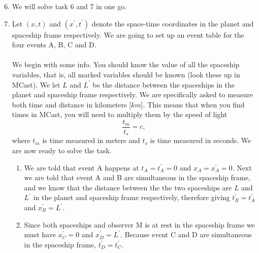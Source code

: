 \documentclass[a4paper,10pt,english]{article}
\begin{document}
\begin{enumerate}
\setcounter{enumi}{5}

\item We will solve task 6 and 7 in one go.
\item Let $(x,t)$ and $(x^{\prime},t^{\prime})$ denote the space-time coordinates in the planet and spaceship frame respectively. We are going to set up an event table for the four events A, B, C and D.
\\ \\
We begin with some info. You should know the value of all the spaceship variables, that is, all marked variables should be known (look these up in MCast). We let $L$ and $L^{\prime}$ be the distance between the spaceships in the planet and spaceship frame respectively. We are specifically asked to measure both time and distance in kilometers [$km$]. This means that when you find times in MCast, you will need to multiply them by the speed of light \[\frac{t_{m}}{t_{s}}=c,\] where $t_{m}$ is time measured in meters and $t_{s}$ is time measured in seconds. We are now ready to solve the task.
\\ 
\begin{enumerate} %
\item We are told that event A happens at $t_{A}=t_{A}^{\prime}=0$ and $x_{A}=x_{A}^{\prime}=0$. Next we are told that event A and B are simultaneous in the spaceship frame, and we know that the distance between the the two spaceships are $L$ and $L^{\prime}$ in the planet and spaceship frame respectively, therefore giving $t_{B}^{\prime}=t^{\prime}_{A}$ and $x_{B}^{\prime}=L^{\prime}$.

\item Since both spaceships and observer M is at rest in the spaceship frame we must have $x_{C}^{\prime}=0$ and $x^{\prime}_{D}=L^{\prime}$. Because event C and D are simultaneous in the spaceship frame, $t^{\prime}_{D}=t^{\prime}_{C}$.


\end{enumerate}
\end{enumerate}
\end{document}

